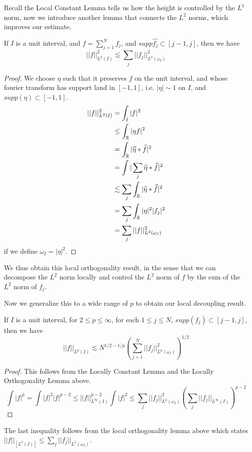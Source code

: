 Recall the Local Constant Lemma tells us how the height is controlled by the $L^1$ norm, now we introduce another lemma that connects the $L^2$ norms, which improves our estimate.
\begin{lemma}
    If $I$ is a unit interval, and $f=\sum_{j=1}^Nf_j$, and $supp\widehat{f_j}\subset[j-1,j]$, then we have
    \begin{equation*}
        ||f||_{L^2(I)}^2\lesssim\sum_j||f_j||_{L^2(\omega_I)}^2
    \end{equation*}
\end{lemma}
\begin{proof}
    We choose $\eta$ such that it preserves $f$ on the unit interval, and whose fourier transform has support land in $[-1,1]$, i.e. $|\eta|\sim 1$ on $I$, and $supp(\eta)\subset[-1,1]$.
    \begin{align*}
        ||f||_{L^2(I)}^2&=\int_I|f|^2\\
        &\leq\int_{\mathbb{R}}|\eta f|^2\\
        &=\int_{\mathbb{R}}|\widehat{\eta}\ast\widehat{f}|^2\\
        &=\int|\sum_j\widehat{\eta}\ast\widehat{f}|^2\\
        &\lesssim\sum_j\int_{\mathbb{R}}|\widehat{\eta}\ast\widehat{f}|^2\\
        &=\sum_j\int_{\mathbb{R}}|\eta|^2|f_j|^2\\
        &=\sum_j||f||_{L^2(\omega_I)}^2
    \end{align*}
    if we define $\omega_I=|\eta|^2$.
\end{proof}

We thus obtain this local orthogonality result, in the sense that we can decompose the $L^2$ norm locally and control the $L^2$ norm of $f$ by the sum of the $L^2$ norm of $f_j$.

Now we generalize this to a wide range of $p$ to obtain our local decoupling result.

\begin{proposition}
    If $I$ is a unit interval, for $2\leq p\leq\infty$, for each $1\leq j\leq N$, $supp(f_j)\subset[j-1,j]$, then we have
    \begin{equation*}
        ||f||_{L^p(I)}\lesssim N^{1/2-1/p}\left(\sum_{j=1}^N||f_j||_{L^p(\omega_I)}^2 \right)^{1/2}
    \end{equation*}
\end{proposition}
\begin{proof}
    This follows from the Locally Constant Lemma and the Locally Orthogonality Lemma above. 
    \begin{equation*}
        \int|f|^p=\int|f|^2|f|^{p-2}\leq||f||_{L^\infty(I)}^{p-2}\int|f|^2\leq\sum_{j}||f_{j}||_{L^2(\omega_I)}^2\left(\sum_j||f_j||_{L^\infty(I)}\right)^{p-2}
    \end{equation*}
\end{proof}
The last inequality follows from the local orthogonality lemma above which states $||f||_[L^2(I)]\leq\sum_j||f_j||_{L^2(\omega_I)}$.

